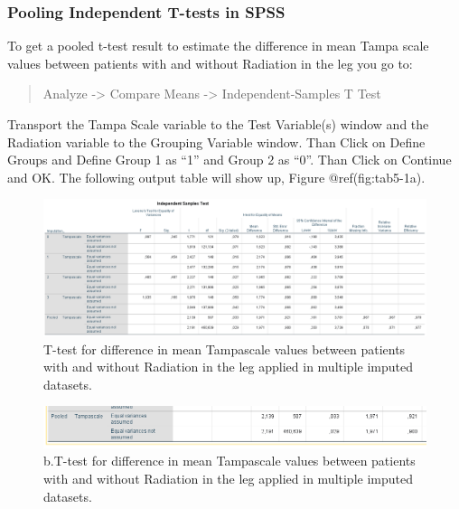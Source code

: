 \documentclass[
]{book}
\begin{document}
\hypertarget{pooling-independent-t-tests-in-spss}{%
\subsubsection{Pooling Independent T-tests in
SPSS}\label{pooling-independent-t-tests-in-spss}}

To get a pooled t-test result to estimate the difference in mean Tampa
scale values between patients with and without Radiation in the leg you
go to:

\begin{quote}
Analyze -\textgreater{} Compare Means -\textgreater{}
Independent-Samples T Test
\end{quote}

Transport the Tampa Scale variable to the Test Variable(s) window and
the Radiation variable to the Grouping Variable window. Than Click on
Define Groups and Define Group 1 as ``1'' and Group 2 as ``0''. Than
Click on Continue and OK. The following output table will show up,
Figure @ref(fig:tab5-1a).

\begin{figure}

{\centering \includegraphics[width=0.9\linewidth]{images/table5.1} 

}

\caption{T-test for difference in mean Tampascale values between patients with and without Radiation in the leg applied in multiple imputed datasets.}\label{fig:tab5-1a}
\end{figure}

\begin{figure}

{\centering \includegraphics[width=0.9\linewidth]{images/table5.1b} 

}

\caption{b.T-test for difference in mean Tampascale values between patients with and without Radiation in the leg applied in multiple imputed datasets.}\label{fig:tab5-1b}
\end{figure}
\end{document}
